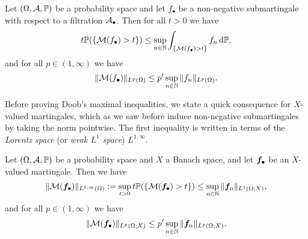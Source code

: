 \begin{thm}\label{thm:doob}
  Let $(\Omega, \mathcal{A}, \mathbb{P})$ be a probability space and let $f_{\bullet}$ be a non-negative submartingale with respect to a filtration $\mathcal{A}_{\bullet}$.
  Then for all $t > 0$ we have
  \begin{equation*}
    t\mathbb{P}(\{\mathcal{M}(f_{\bullet}) > t\}) \leq   \sup_{n \in \mathbb{N}} \int_{\{\mathcal{M}(f_{\bullet}) > t\}} f_{n} \, \mathrm{d}\mathbb{P},
  \end{equation*}
  and for all $p \in (1,\infty)$ we have
  \begin{equation*}
    \|\mathcal{M}(f_{\bullet})\|_{L^p(\Omega)} \leq p' \sup_{n \in \mathbb{N}} \|f_{n}\|_{L^p(\Omega)}.
  \end{equation*}
\end{thm}

Before proving Doob's maximal inequalities, we state a quick consequence for $X$-valued martingales, which as we saw before induce non-negative submartingales by taking the norm pointwise.
The first inequality is written in terms of the \emph{Lorentz space} (or \emph{weak $L^1$ space}) $L^{1,\infty}$.

\begin{cor}
  Let $(\Omega, \mathcal{A}, \mathbb{P})$ be a probability space and $X$ a Banach space, and let $\bm{f}_{\bullet}$ be an $X$-valued martingale.
  Then we have
  \begin{equation*}
    \|\mathcal{M}(\bm{f}_{\bullet})\|_{L^{1,\infty}(\Omega)} :=  \sup_{t > 0} t\mathbb{P}(\{\mathcal{M}(\bm{f}_{\bullet}) > t\}) \leq  \sup_{n \in \mathbb{N}} \|\bm{f}_{n}\|_{L^1(\Omega;X)},
  \end{equation*}
  and for all $p \in (1,\infty)$ we have
  \begin{equation*}
    \|\mathcal{M}(\bm{f}_{\bullet})\|_{L^p(\Omega;X)} \leq p' \sup_{n \in \mathbb{N}} \|\bm{f}_{n}\|_{L^p(\Omega;X)}.
  \end{equation*}
\end{cor}

